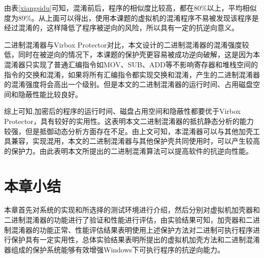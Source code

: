 由表\ref{xiangsidu}可知，混淆前后，程序的相似度比较高，都在80$\%$以上，平均相似度为89$\%$。从上面可以得出，使用本课题的虚拟机的混淆程序不易被发现该程序是经过混淆的，这样降低了程序被逆向的风险，所以具有一定的抗逆向意义。

二进制混淆器与Virbox Protector对比，本文设计的二进制混淆器的混淆强度较低，同时在被逆向的情况下，本课题的保护壳更容易被成功逆向破解，这是因为本混淆器只实现了普通汇编指令如MOV、SUB、ADD等不影响寄存器和堆栈空间的指令的交换和混淆，如果将所有汇编指令都实现交换和混淆，产生的二进制混淆器的混淆强度将会高出一个级别。但是本文的二进制混淆器的运行时间、占用磁盘空间和隐蔽性能比较良好。

综上可知,加密后的程序的运行时间、磁盘占用空间和隐蔽性都要优于Virbox Protector，具有较好的实用性。这表明本文二进制混淆器的抵抗静态分析的能力较强，但是抵御动态分析方面存在不足。由上文可知，本混淆器可以与其他加壳工具兼容，实现混用，本文的二进制混淆器与其他保护壳共同使用时，可以产生较高的保护力。由此表明本文所提出的二进制混淆算法可以提高软件的抗逆向性能。

\section{本章小结}

本章首先对系统的实现和所选择的测试环境进行介绍，然后分别对虚拟机加壳器和二进制混淆器的功能进行了验证和性能进行评估，由实验结果可知，加壳器和二进制混淆器的功能正常、性能评估结果表明使用上述保护方法对二进制可执行程序进行保护具有一定实用性，总体实验结果表明所提出的虚拟机加壳方法和二进制混淆器组成的保护系统能够有效增强Windows下可执行程序的抗逆向能力。



















